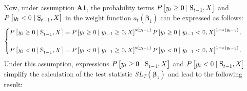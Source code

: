 \documentclass[harvard,11pt]{article}
\begin{document}
Now, under assumption \textbf{A1}, the probability terms $P\left[
y_{t}\geq 0\mid \text{\b{S}}_{t-1},X\right] $ and $P\left[
y_{t}<0\mid \text{\b{S}}_{t-1},X\right] $ in the weight function $a_{t}(\bm{\beta}
_{1})$ can be expressed as follows:%
\begin{equation*}
\begin{cases}
P\left[ y_{t}\geq 0\mid \text{\b{S}}_{t-1},X\right] =P%
\left[ y_{t}\geq 0\mid y_{t-1}\geq 0,X\right] ^{s(y_{t-1})}P\left[
y_{t}\geq 0\mid y_{t-1}<0,X\right] ^{1-s(y_{t-1})},\\ 
\\ 
P\left[ y_{t}<0\mid \text{\b{S}}_{t-1},X\right] =P\left[
y_{t}<0\mid y_{t-1}\geq 0,X\right] ^{s(y_{t-1})}P\left[ y_{t}<0\mid
y_{t-1}<0,X\right] ^{1-s(y_{t-1})}.%
\end{cases}%
\end{equation*}%
Under this assumption, expressions $P\left[ y_{t}\geq 0\mid \text{%
\b{S}}_{t-1},X\right] $ and $P\left[ y_{t}<0\mid \text{\b{S}}%
_{t-1},X\right] $ simplify the calculation of the test statistic $%
SL_{T}(\bm{\beta}_{1})$ and lead to the following result:
\end{document}
